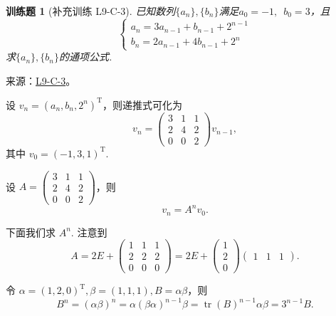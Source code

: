 \documentclass[12pt,fontset=fandol]{ctexart}
\newtheorem{exercise}{训练题}[section]
\begin{document}
\begin{exercise}[补充训练 L9-C-3]\label{prob:L9-C-3}
已知数列$\{a_n\},\{b_n\}$满足$a_0=-1,\enspace b_0=3$，且
        \[\begin{cases}
                a_n=3a_{n-1}+b_{n-1}+2^{n-1} \\
                b_n=2a_{n-1}+4b_{n-1}+2^n
            \end{cases}\]
        求$\{a_n\},\{b_n\}$的通项公式.
\end{exercise}
\noindent 来源：\href{https://github.com/yhwu-is/Linear-Algebra-Left-Undone/blob/new/%E8%AE%B2%E4%B9%89/%E4%B8%93%E9%A2%98/9%20%E7%9F%A9%E9%98%B5%E8%BF%90%E7%AE%97%E8%BF%9B%E9%98%B6.tex}{L9-C-3}。
\begin{solve}
设 $v_n = (a_n, b_n, 2^n)^\mathrm{T}$，则递推式可化为
            \[
                v_n = \begin{pmatrix}
                    3 & 1 & 1 \\ 2 & 4 & 2 \\ 0 & 0 & 2
                \end{pmatrix} v_{n-1},
            \]
            其中 $v_0 = (-1, 3, 1)^\mathrm{T}$.

            设 $A = \begin{pmatrix}
                3 & 1 & 1 \\ 2 & 4 & 2 \\ 0 & 0 & 2
            \end{pmatrix}$，则
            \[
                v_n = A^n v_0.
            \]

            下面我们求 $A^n$. 注意到
            \[
                A = 2E + \begin{pmatrix}
                    1 & 1 & 1 \\ 2 & 2 & 2 \\ 0 & 0 & 0
                  \end{pmatrix}
                  = 2E + \begin{pmatrix}
                      1 \\ 2 \\ 0
                  \end{pmatrix} \begin{pmatrix}
                      1 & 1 & 1
                  \end{pmatrix}.
            \]

            令 $\alpha = (1, 2, 0)^\mathrm{T}, \beta = (1, 1, 1), B=\alpha \beta$，则
            \[
                B^n = \left( \alpha \beta \right)^n = \alpha \left( \beta \alpha \right)^{n-1} \beta = \operatorname{tr}(B)^{n-1} \alpha \beta = 3^{n-1} B.
            \]


\end{solve}
\end{document}
